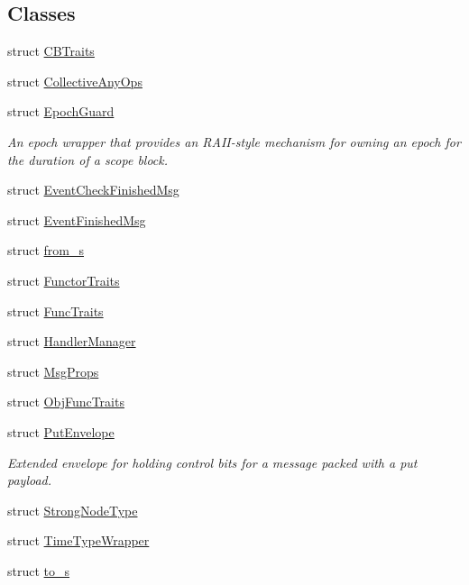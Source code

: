 \subsection*{Classes}
\begin{DoxyCompactItemize}
\item 
struct \hyperlink{structvt_1_1_c_b_traits}{C\+B\+Traits}
\item 
struct \hyperlink{structvt_1_1_collective_any_ops}{Collective\+Any\+Ops}
\item 
struct \hyperlink{structvt_1_1_epoch_guard}{Epoch\+Guard}
\begin{DoxyCompactList}\small\item\em An epoch wrapper that provides an R\+A\+I\+I-\/style mechanism for owning an epoch for the duration of a scope block. \end{DoxyCompactList}\item 
struct \hyperlink{structvt_1_1_event_check_finished_msg}{Event\+Check\+Finished\+Msg}
\item 
struct \hyperlink{structvt_1_1_event_finished_msg}{Event\+Finished\+Msg}
\item 
struct \hyperlink{structvt_1_1from__s}{from\+\_\+s}
\item 
struct \hyperlink{structvt_1_1_functor_traits}{Functor\+Traits}
\item 
struct \hyperlink{structvt_1_1_func_traits}{Func\+Traits}
\item 
struct \hyperlink{structvt_1_1_handler_manager}{Handler\+Manager}
\item 
struct \hyperlink{structvt_1_1_msg_props}{Msg\+Props}
\item 
struct \hyperlink{structvt_1_1_obj_func_traits}{Obj\+Func\+Traits}
\item 
struct \hyperlink{structvt_1_1_put_envelope}{Put\+Envelope}
\begin{DoxyCompactList}\small\item\em Extended envelope for holding control bits for a message packed with a put payload. \end{DoxyCompactList}\item 
struct \hyperlink{structvt_1_1_strong_node_type}{Strong\+Node\+Type}
\item 
struct \hyperlink{structvt_1_1_time_type_wrapper}{Time\+Type\+Wrapper}
\item 
struct \hyperlink{structvt_1_1to__s}{to\+\_\+s}
\end{DoxyCompactItemize}
